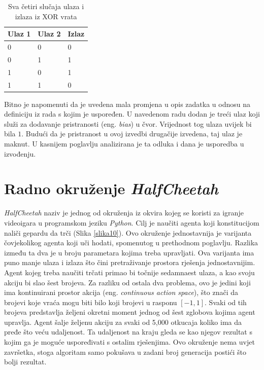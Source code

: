 \documentclass[times, utf8, diplomski, numeric]{fer}
\begin{document}
\begin{table}
  \centering
  \begin{tabular}{|l|l|l|}
    \hline
    Ulaz 1 & Ulaz 2 & Izlaz \\ \hline
    0      & 0      & 0     \\ \hline
    0      & 1      & 1     \\ \hline
    1      & 0      & 1     \\ \hline
    1      & 1      & 0     \\ \hline
  \end{tabular}
  \caption{Sva četiri slučaja ulaza i izlaza iz XOR vrata}
  \label{tablica1}
\end{table}

Bitno je napomenuti da je uvedena mala promjena u opis zadatka u odnosu na definiciju iz rada \citep{rad5} s kojim je uspoređen. U navedenom radu dodan je treći ulaz koji služi za dodavanje pristranosti (eng. \textit{bias}) u čvor. Vrijednost tog ulaza uvijek bi bila $1$. Budući da je pristranost u ovoj izvedbi drugačije izvedena, taj ulaz je maknut. U kasnijem poglavlju analizirana je ta odluka i dana je usporedba u izvođenju.

\section{Radno okruženje \textit{HalfCheetah}}
\textit{HalfCheetah} naziv je jednog od okruženja iz okvira kojeg se koristi za igranje videoigara u programskom jeziku \textit{Python}. Cilj je naučiti agenta koji konstitucijom naliči gepardu da trči (Slika \ref{slika10}). Ovo okruženje jednostavnija je varijanta čovjekolikog agenta koji uči hodati, spomenutog u prethodnom poglavlju. Razlika između ta dva je u broju parametara kojima treba upravljati. Ova varijanta ima puno manje ulaza i izlaza što čini pretraživanje prostora rješenja jednostavnijim. Agent kojeg treba naučiti trčati primao bi točnije sedamnaest ulaza, a kao svoju akciju bi slao šest brojeva. Za razliku od ostala dva problema, ovo je jedini koji ima kontinuirani prostor akcija (eng. \textit{continuous action space}), što znači da brojevi koje vraća mogu biti bilo koji brojevi u rasponu $[-1, 1]$. Svaki od tih brojeva predstavlja željeni okretni moment jednog od šest zglobova kojima agent upravlja. Agent šalje željenu akciju za svaki od 5,000 otkucaja koliko ima da pređe što veću udaljenost. Ta udaljenost na kraju gleda se kao njegov rezultat s kojim ga je moguće uspoređivati s ostalim rješenjima. Ovo okruženje nema uvjet završetka, stoga algoritam samo pokušava u zadani broj generacija postići što bolji rezultat.
\end{document}
